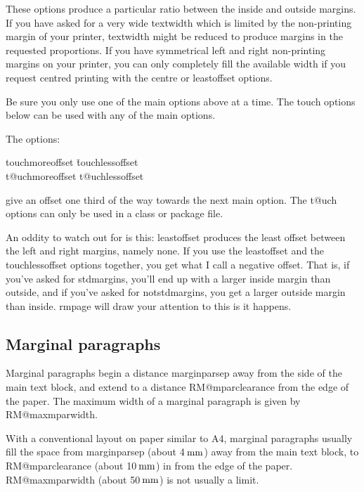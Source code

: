 \documentclass[11pt,loose,twoside,touchwider,longish,
                      noheaders,a4paper,notstdmargins]{report}
\makeatletter
\newcommand*{\unit}[1]{\ifmmode\@unit{\hbox{#1}}\else$\@unit{\hbox{#1}}$\fi}%
\let\units=\unit
\def\@unit#1{{\setbox0=\hbox{#1}\ifdim\wd0<1.125em\,\else\>\fi\box0}}
\DeclareRobustCommand*{\comname}[1]{{\ttfamily\makeatletter\bs #1\makeatother}}
\newcommand*{\classname}[1]{{\ttfamily #1}}
\newcommand*{\optname}[1]{{\ttfamily #1}}
\newcommand*{\rmpage}{\classname{rmpage}\xspace}
\makeatother
\begin{document}
These options produce a particular ratio between the inside and
outside margins.  If you have asked for a very wide
\comname{textwidth} which is limited by the non-printing margin of
your printer, \comname{textwidth} might be reduced to produce margins
in the requested proportions.  If you have symmetrical left and right
non-printing margins on your printer, you can only completely fill the
available width if you request centred printing with the
\optname{centre} or \optname{leastoffset} options.

Be sure you only use one of the main options above at a time.  The
\optname{touch} options below can be used with any of the main options.

The options:
\begin{tabbing}
\optname{touchmoreoffset} \= \optname{touchlessoffset} \\
\optname{t@uchmoreoffset} \> \optname{t@uchlessoffset}
\end{tabbing}
give an offset one third of the way towards the next main option.  The
\optname{t@uch} options can only be used in a class or package file.

An oddity to watch out for is this: \optname{leastoffset} produces the
least offset between the left and right margins, namely none.  If you
use the \optname{leastoffset} and the \optname{touchlessoffset}
options together, you get what I call a negative offset.  That is, if
you've asked for \optname{stdmargins}, you'll end up with a larger
inside margin than outside, and if you've asked for
\optname{notstdmargins}, you get a larger outside margin than inside.
\rmpage will draw your attention to this is it happens.

\subsection{Marginal paragraphs}
\label{use:marginalparapgraphs}

Marginal paragraphs begin a distance \comname{marginparsep} away from
the side of the main text block, and extend to a distance
\comname{RM@mparclearance} from the edge of the paper.  The maximum
width of a marginal paragraph is given by \comname{RM@maxmparwidth}.

With a conventional layout on paper similar to A4, marginal paragraphs
usually fill the space from \comname{marginparsep} (about 4\units{mm})
away from the main text block, to \comname{RM@mparclearance} (about
10\units{mm}) in from the edge of the paper.
\comname{RM@maxmparwidth} (about 50\units{mm}) is not usually a limit.
\end{document}
